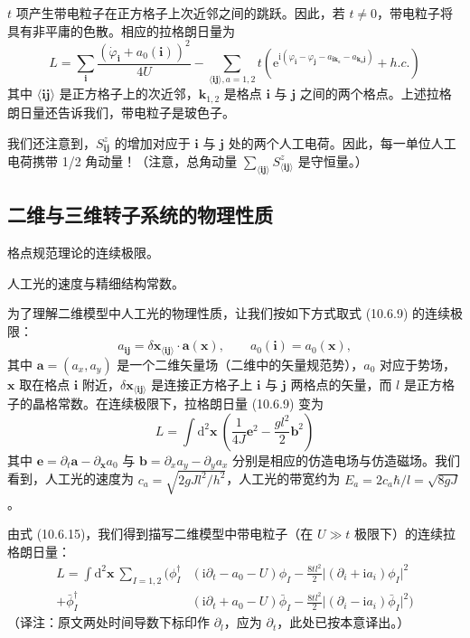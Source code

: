 $t$ 项产生带电粒子在正方格子上次近邻之间的跳跃。因此，若 $t\neq0$，带电粒子将具有非平庸的色散。相应的拉格朗日量为
\begin{equation*}
L=\sum_{\pmb i}\frac{(\dot{\varphi}_{\pmb i}+a_0(\pmb i))^{2}}{4U}-\sum_{\langle\pmb i\pmb j\rangle,a=1,2}t(\mathrm{e}^{\mathrm{i}(\varphi_{\pmb i}-\varphi_{\pmb j}-a_{\pmb i\pmb k_a}-a_{\pmb k_a\pmb j})}+h.c.)\tag{10.6.15}
\end{equation*}
其中 $\langle\pmb i\pmb j\rangle$ 是正方格子上的次近邻，$\pmb k_{1,2}$ 是格点 $\pmb i$ 与 $\pmb j$ 之间的两个格点。上述拉格朗日量还告诉我们，带电粒子是玻色子。

我们还注意到，$S^{z}_{\pmb i\pmb j}$ 的增加对应于 $\pmb i$ 与 $\pmb j$ 处的两个人工电荷。因此，每一单位人工电荷携带 1/2 角动量！（注意，总角动量 $\sum_{\langle\pmb i\pmb j\rangle}S^{z}_{\langle\pmb i\pmb j\rangle}$ 是守恒量。）

\subsection{二维与三维转子系统的物理性质}

\begin{keypoints}
\item 格点规范理论的连续极限。
\item 人工光的速度与精细结构常数。
\end{keypoints}

为了理解二维模型中人工光的物理性质，让我们按如下方式取式 (10.6.9) 的连续极限：
\begin{equation*}
a_{\pmb i\pmb j}=\delta\pmb x_{\langle\pmb i\pmb j\rangle}\cdot\pmb a(\pmb x),\qquad a_0(\pmb i)=a_0(\pmb x),
\end{equation*}
其中 $\pmb a=(a_x,a_y)$ 是一个二维矢量场（二维中的矢量规范势），$a_0$ 对应于势场，$\pmb x$ 取在格点 $\pmb i$ 附近，$\delta\pmb x_{\langle\pmb i\pmb j\rangle}$ 是连接正方格子上 $\pmb i$ 与 $\pmb j$ 两格点的矢量，而 $l$ 是正方格子的晶格常数。在连续极限下，拉格朗日量 (10.6.9) 变为
\begin{equation*}
L=\int\mathrm{d}^{2}\pmb x\ \left(\frac{1}{4J}\pmb e^{2}-\frac{gl^{2}}{2}\pmb b^{2}\right)\tag{10.6.16}
\end{equation*}
其中 $\pmb e=\partial_t\pmb a-\partial_{\pmb x}a_0$ 与 $\pmb b=\partial_x a_y-\partial_y a_x$ 分别是相应的仿造电场与仿造磁场。我们看到，人工光的速度为 $c_a=\sqrt{2gJl^{2}/h^{2}}$，人工光的带宽约为 $E_a=2c_a\hbar/l=\sqrt{8gJ}$。

由式 (10.6.15)，我们得到描写二维模型中带电粒子（在 $U\gg t$ 极限下）的连续拉格朗日量：
\begin{align*}
L=\int\mathrm{d}^{2}\pmb x\ \sum_{I=1,2}\Big(\phi^{\dagger}_{I}&(\mathrm{i}\partial_t-a_0-U)\phi_I-\frac{8tl^{2}}{2}\big|(\partial_{i}+\mathrm{i}a_{i})\phi_I\big|^{2}\\
+\bar{\phi}^{\dagger}_{I}&(\mathrm{i}\partial_t+a_0-U)\bar{\phi}_I-\frac{8tl^{2}}{2}\big|(\partial_{i}-\mathrm{i}a_{i})\bar{\phi}_I\big|^{2}\Big)
\end{align*}
（译注：原文两处时间导数下标印作 $\partial_l$，应为 $\partial_t$，此处已按本意译出。）

